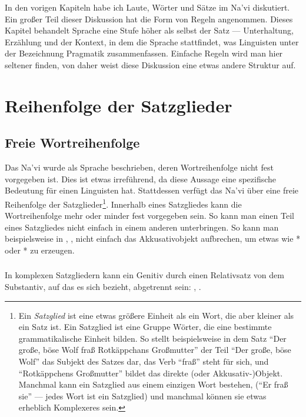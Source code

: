 
\noindent In den vorigen Kapiteln habe ich Laute, W\"orter und S\"atze im Na’vi
diskutiert. Ein gro\ss{}er Teil dieser Diskussion hat die Form von Regeln angenommen.
Dieses Kapitel behandelt Sprache eine Stufe h\"oher als selbst der Satz ---
Unterhaltung, Erz\"ahlung und der Kontext, in dem die Sprache stattfindet, was
Linguisten unter der Bezeichnung Pragmatik zusammenfassen. Einfache Regeln wird man
hier seltener finden, von daher weist diese Diskussion eine etwas andere Struktur
auf.

\section{Reihenfolge der Satzglieder}

\subsection{Freie Wortreihenfolge}  Das Na’vi wurde als Sprache beschrieben, deren
Wortreihenfolge nicht fest vorgegeben ist. Dies ist etwas irref\"uhrend, da diese
Aussage eine spezifische Bedeutung f\"ur einen Linguisten hat. Stattdessen verf\"ugt
das Na’vi \"uber eine freie Reihenfolge der Satzglieder\footnote{Ein
\textit{Satzglied} ist eine etwas gr\"o\ss{}ere Einheit als ein Wort, die aber
kleiner als ein Satz ist. Ein Satzglied ist eine Gruppe W\"orter, die eine
bestimmte grammatikalische Einheit bilden. So stellt beispielsweise in dem Satz "`Der
gro\ss{}e, b\"ose Wolf fra\ss{} Rotk\"appchans Gro\ss{}mutter"' der Teil "`Der gro\ss{}e,
b\"ose Wolf"' das Subjekt des Satzes dar, das Verb "`fra\ss{}"' steht f\"ur sich, und
"`Rotk\"appchens Gro\ss{}mutter"' bildet das direkte (oder Akkusativ-)Objekt. Manchmal
kann ein Satzglied aus einem einzigen Wort bestehen, ("`Er fra\ss{} sie"' --- jedes Wort 
ist ein Satzglied) und manchmal k\"onnen sie etwas erheblich Komplexeres sein.}.
Innerhalb eines Satzgliedes kann die Wortreihenfolge mehr oder minder fest vorgegeben
sein. So kann man einen Teil eines Satzgliedes nicht einfach in einem anderen unterbringen.
So kann man beispielsweise in , , nicht einfach das Akkusativobjekt  aufbrechen,
um etwas wie * oder *
zu erzeugen.

\subsubsection{} In komplexen Satzgliedern kann ein Genitiv durch einen Relativsatz von
dem Substantiv, auf das es sich bezieht, abgetrennt sein: , .

